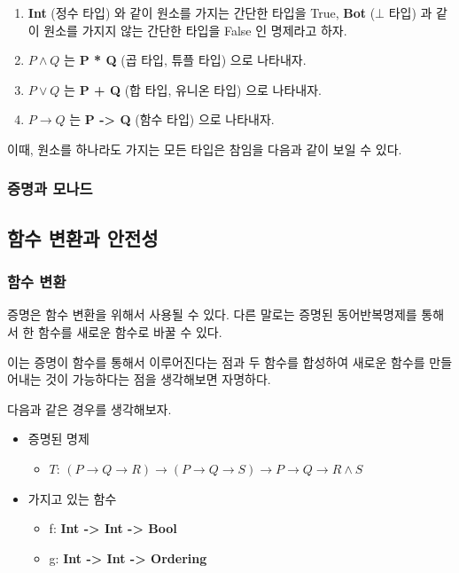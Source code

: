 \documentclass[a4paper, 12pt]{oblivoir}
\newcommand{\texttype}[1]{{\bfseries\ttfamily#1}}
\begin{document}
\begin{enumerate}
\item \texttype{Int} (정수 타입) 와 같이 원소를 가지는 간단한 타입을 True, \texttype{Bot} ($\bot{}$ 타입) 과 같이 원소를 가지지 않는 간단한 타입을 False 인 명제라고 하자.
\item $P \wedge{} Q$ 는 \texttype{P * Q} (곱 타입, 튜플 타입) 으로 나타내자.
\item $P \vee{} Q$ 는 \texttype{P + Q} (합 타입, 유니온 타입) 으로 나타내자.
\item $P \rightarrow{} Q$ 는 \texttype{P -> Q} (함수 타입) 으로 나타내자.
\end{enumerate}

이때, 원소를 하나라도 가지는 모든 타입은 참임을 다음과 같이 보일 수 있다.

\subsubsection{증명과 모나드}


\subsection{함수 변환과 안전성}
\subsubsection{함수 변환}
증명은 함수 변환을 위해서 사용될 수 있다.
다른 말로는 증명된 동어반복명제를 통해서 한 함수를 새로운 함수로 바꿀 수 있다.

이는 증명이 함수를 통해서 이루어진다는 점과
두 함수를 합성하여 새로운 함수를 만들어내는 것이 가능하다는 점을 생각해보면 자명하다.

다음과 같은 경우를 생각해보자.

\begin{itemize}[noitemsep]
  \small
\item 증명된 명제
  \begin{itemize}
  \item $T$: $(P \rightarrow{} Q \rightarrow{} R) \rightarrow{}
    (P \rightarrow{} Q \rightarrow{} S) \rightarrow{}
    P \rightarrow{} Q \rightarrow{} R \wedge{} S$
  \end{itemize}

\item 가지고 있는 함수
  \begin{itemize}
  \item f: \texttype{Int -> Int -> Bool}
  \item g: \texttype{Int -> Int -> Ordering}
\end{itemize}

\end{itemize}
\end{document}
